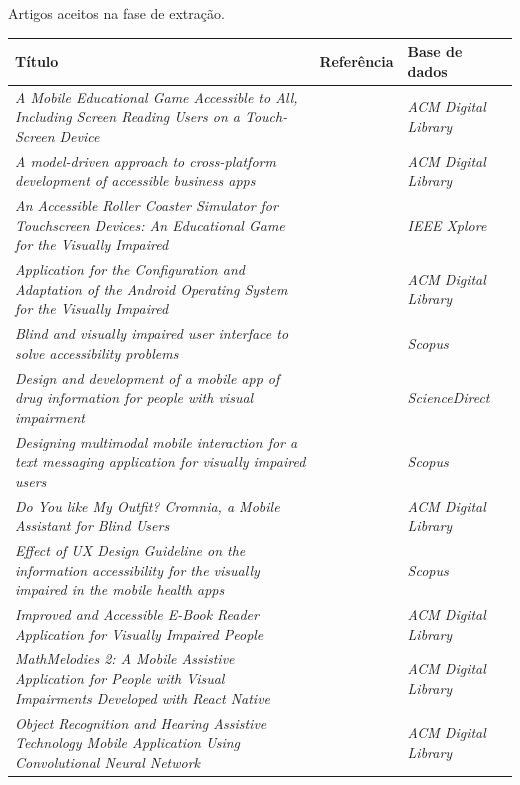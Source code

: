 \begin{quadro}[htb!]
\caption{\label{qua-pal-sin}Artigos aceitos na fase de extração.}
\begin{tabular}{|m{9.5cm} | m{2.7cm} | m{2.5cm}|}
    \hline
   \textbf{Título} & \textbf{Referência} & \textbf{Base de dados} \\ \hline
    \emph{A Mobile Educational Game Accessible to All, Including Screen Reading Users on a Touch-Screen Device} & \cite{Leporini2017} & \emph{ACM Digital Library} \\ \hline
    \emph{A model-driven approach to cross-platform development of accessible business apps} & \cite{Christoph2020} & \emph{ACM Digital Library} \\ \hline
    \emph{An Accessible Roller Coaster Simulator for Touchscreen Devices: An Educational Game for the Visually Impaired} & \cite{Biase2018} & \emph{IEEE Xplore} \\ \hline
    \emph{Application for the Configuration and Adaptation of the Android Operating System for the Visually Impaired} & \cite{Oliveira2018} & \emph{ACM Digital Library} \\ \hline
    \emph{Blind and visually impaired user interface to solve accessibility problems} & \cite{Shera2021285} & \emph{Scopus} \\ \hline
    \emph{Design and development of a mobile app of drug information for people with visual impairment} & \cite{Amariles2020} & \emph{ScienceDirect} \\ \hline
    \emph{Designing multimodal mobile interaction for a text messaging application for visually impaired users} & \cite{Duarte2017} & \emph{Scopus} \\ \hline
    \emph{Do You like My Outfit? Cromnia, a Mobile Assistant for Blind Users} & \cite{Giuliana2018} & \emph{ACM Digital Library} \\ \hline
    \emph{Effect of UX Design Guideline on the information accessibility for the visually impaired in the mobile health apps} & \cite{Kim20191103} & \emph{Scopus} \\ \hline
    \emph{Improved and Accessible E-Book Reader Application for Visually Impaired People} & \cite{Heesook2017} & \emph{ACM Digital Library} \\ \hline
    \emph{MathMelodies 2: A Mobile Assistive Application for People with Visual Impairments Developed with React Native} & \cite{Ducci2018} & \emph{ACM Digital Library} \\ \hline
    \emph{Object Recognition and Hearing Assistive Technology Mobile Application Using Convolutional Neural Network} & \cite{Caballero2020} & \emph{ACM Digital Library} \\ \hline

\end{tabular}
\end{quadro}

